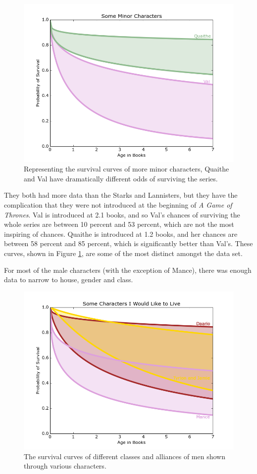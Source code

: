 \documentclass{article}
\begin{document}
\begin{figure}[ht!]
\centering
\includegraphics[width=6in]{Fem2.png}
\caption{Representing the survival curves of more minor characters, Quaithe and Val have dramatically different odds of surviving the series.}
\label{fig:minorwomen}
\end{figure}
They both had more data than the Starks and Lannisters, but they have the complication that they were not introduced at the beginning of \textit{A Game of Thrones}. Val is introduced at 2.1 books, and so Val's chances of surviving the whole series are between 10 percent and 53 percent, which are not the most inspiring of chances.  Quaithe is introduced at 1.2 books, and her chances are between 58 percent and 85 percent, which is significantly better than Val's. These curves, shown in Figure \ref{fig:minorwomen}, are some of the most distinct amongst the data set.
\newpage

For most of the male characters (with the exception of Mance), there was enough data to narrow to house, gender and class.

\begin{figure}[ht!]
\centering
\includegraphics[width=6in]{Male1.png}
\caption{The survival curves of different classes and alliances of men shown through various characters.}
\label{fig:male1}
\end{figure}
\end{document}
